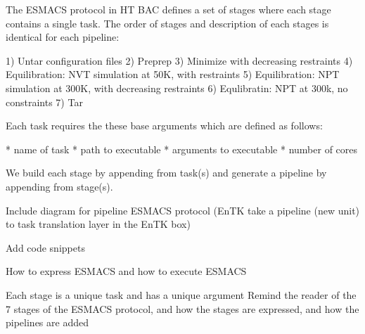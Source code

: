 The ESMACS protocol in HT BAC defines a set of stages where each stage contains a single task. The order of stages and description of each stages is identical for each pipeline:

1) Untar configuration files
2) Preprep 
3) Minimize with decreasing restraints
4) Equilibration: NVT simulation at 50K, with restraints
5) Equilibration: NPT simulation at 300K, with decreasing restraints 
6) Equlibratin: NPT at 300k, no constraints
7) Tar


Each task requires the these base arguments which are defined as follows:

* name of task
* path to executable 
* arguments to executable
* number of cores 

We build each stage by appending from task(s) and generate a pipeline by appending from stage(s). 

Include diagram for pipeline ESMACS protocol (EnTK take a pipeline (new unit) to task translation layer in the EnTK box)

Add code snippets 

How to express ESMACS and how to execute ESMACS

Each stage is a unique task and has a unique argument
Remind the reader of the 7 stages of the ESMACS protocol, and how the stages are expressed, and how the pipelines are added 

